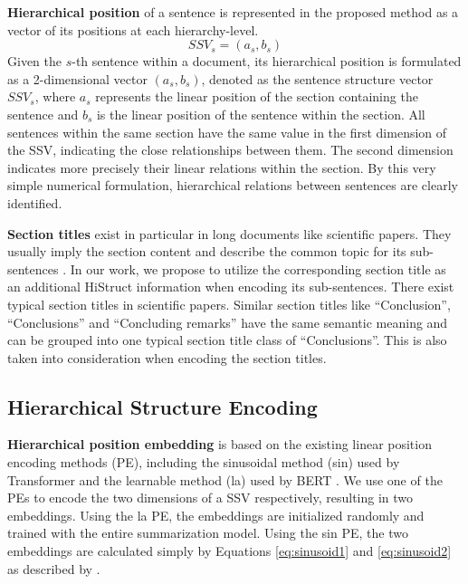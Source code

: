 \documentclass[11pt]{article}
\begin{document}
\textbf{Hierarchical position} of a sentence is represented in the proposed method as a vector of its positions at each hierarchy-level. 
\begin{equation} \label{eq:sentstructvec}
SSV_s = (a_s, b_s)
\end{equation}
Given the $s$-th sentence within a document, its hierarchical position is formulated as a 2-dimensional vector $(a_s,b_s)$, denoted as the sentence structure vector $SSV_{s}$, where $a_s$ represents the linear position of the section containing the sentence and $b_s$ is the linear position of the sentence within the section. All sentences within the same section have the same value in the first dimension of the SSV, indicating the close relationships between them. The second dimension indicates more precisely their linear relations within the section. By this very simple numerical formulation, hierarchical relations between sentences are clearly identified. 


\textbf{Section titles} exist in particular in long documents like scientific papers. They usually imply the section content and describe the common topic for its sub-sentences \cite{ostendorff-etal-2020-aspect}. 
In our work, we propose to utilize the corresponding section title as an additional HiStruct information when encoding its sub-sentences. There exist typical section titles in scientific papers. Similar section titles like ``Conclusion'', ``Conclusions'' and ``Concluding remarks''  have the same semantic meaning and can be grouped into one typical section title class of ``Conclusions''. This is also taken into consideration when encoding the section titles. 

\subsection{Hierarchical Structure Encoding}
\label{subsec:hierarchical_structure_encoding}


\textbf{Hierarchical position embedding} is based on the existing linear position encoding methods (PE), including the sinusoidal method (sin) used by Transformer \cite{transformer} and the learnable method (la) used by BERT \cite{bert}. We use one of the PEs to encode the two dimensions of a SSV respectively, resulting in two embeddings. Using the la PE, the embeddings are initialized randomly and trained with the entire summarization model. Using the sin PE, the two embeddings are calculated simply by Equations \ref{eq:sinusoid1} and \ref{eq:sinusoid2} as described by \citet{transformer}. 
\end{document}
